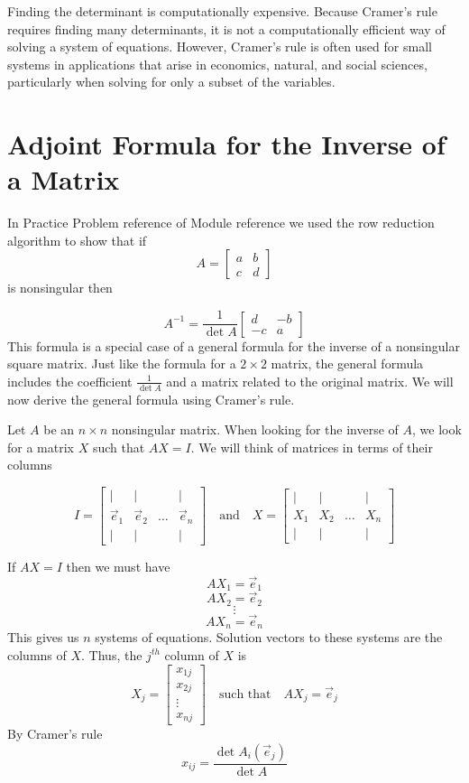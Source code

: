 \documentclass{ximera}
\begin{document}
Finding the determinant is computationally expensive.  Because Cramer's rule requires finding many determinants, it is not a computationally efficient way of solving a system of equations.  However, Cramer's rule is often used for small systems in applications that arise in economics, natural, and social sciences, particularly when solving for only a subset of the variables.

\section*{Adjoint Formula for the Inverse of a Matrix}

In Practice Problem {\color{red} reference} of Module {\color{red} reference} we used the row reduction algorithm to show that if $$A=\begin{bmatrix}a&b\\c&d\end{bmatrix}$$ is nonsingular then 

\begin{equation}\label{eq:twobytwoinverse}A^{-1}=\frac{1}{\det{A}}\begin{bmatrix}d&-b\\-c&a\end{bmatrix}\end{equation}
This formula is a special case of a general formula for the inverse of a nonsingular square matrix.  Just like the formula for a $2\times 2$ matrix, the general formula  includes the coefficient $\frac{1}{\det{A}}$ and a matrix related to the original matrix.  We will now derive the general formula using Cramer's rule.

Let $A$ be an $n\times n$ nonsingular matrix.  When looking for the inverse of $A$, we look for a matrix $X$ such that $AX=I$.  We will think of matrices in terms of their columns

$$I=\begin{bmatrix}
           | & |& &|\\
		\vec{e}_1 & \vec{e}_2&\dots&\vec{e}_n\\
		| & |& &|
         \end{bmatrix}\quad\text{and}\quad X=\begin{bmatrix}
           | & |& &|\\
		X_1 & X_2&\dots&X_n\\
		| & |& &|
         \end{bmatrix}$$

If $AX=I$ then we must have
$$AX_1=\vec{e}_1$$
$$AX_2=\vec{e}_2$$
$$\vdots$$
$$AX_n=\vec{e}_n$$
This gives us $n$ systems of equations.  Solution vectors to these systems are the columns of $X$.  Thus, the $j^{th}$ column of $X$ is
$$X_j=\begin{bmatrix}x_{1j}\\x_{2j}\\\vdots\\x_{nj}\end{bmatrix}\quad\text{such that}\quad AX_j=\vec{e}_j$$
By Cramer's rule 
$$x_{ij}=\frac{\det{A_i(\vec{e}_j)}}{\det{A}}$$
         
\end{document}
